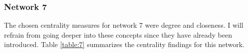 \subsubsection{Network 7}
The chosen centrality measures for network 7 were degree and closeness. I will refrain from going deeper into these concepts since they have already been introduced. Table \ref{table:7} summarizes the centrality findings for this network.
\begin{table}
    \centering
    \qquad
    \caption{Network 7 centrality}
    \label{table:7}
\end{table}
